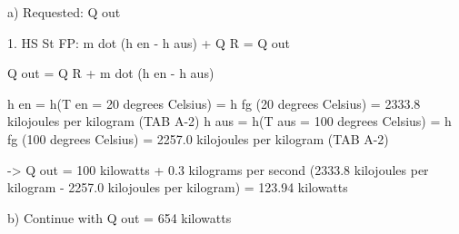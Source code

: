 a) Requested: Q out

1. HS St FP:  
m dot (h en - h aus) + Q R = Q out  

Q out = Q R + m dot (h en - h aus)

h en = h(T en = 20 degrees Celsius) = h fg (20 degrees Celsius) = 2333.8 kilojoules per kilogram (TAB A-2)  
h aus = h(T aus = 100 degrees Celsius) = h fg (100 degrees Celsius) = 2257.0 kilojoules per kilogram (TAB A-2)

-> Q out = 100 kilowatts + 0.3 kilograms per second (2333.8 kilojoules per kilogram - 2257.0 kilojoules per kilogram)  
= 123.94 kilowatts

b) Continue with Q out = 654 kilowatts